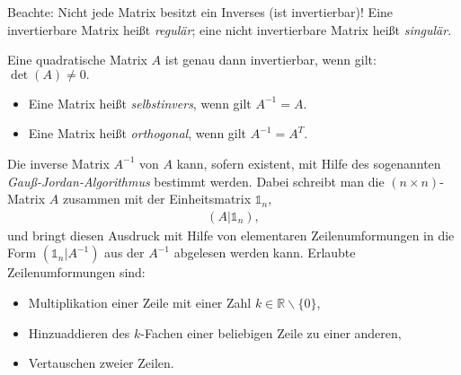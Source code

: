 Beachte: Nicht jede Matrix besitzt ein Inverses (ist invertierbar)! Eine invertierbare Matrix heißt \emph{regulär}; eine nicht invertierbare Matrix heißt \emph{singulär}. 
\begin{satz}
    Eine quadratische Matrix $A$ ist genau dann invertierbar, wenn gilt: $\det(A) \neq 0.$
\end{satz}
\begin{itemize}
    \item Eine Matrix heißt \emph{selbstinvers}, wenn gilt $A^{-1} =A$. 
    \item Eine Matrix heißt \emph{orthogonal}, wenn gilt $A^{-1} = A^T$.
\end{itemize}
Die inverse Matrix $A^{-1}$ von $A$ kann, sofern existent, mit Hilfe des sogenannten \emph{Gauß-Jordan-Algorithmus} bestimmt werden. Dabei schreibt man die $(n\times n)$-Matrix $A$ zusammen mit der Einheitsmatrix $\mathds{1}_n$, 
\begin{align}
    (A | \mathds{1}_n),
\end{align}
und bringt diesen Ausdruck mit Hilfe von elementaren Zeilenumformungen in die Form $(\mathds{1}_n | A^{-1})$ aus der $A^{-1}$ abgelesen werden kann. Erlaubte Zeilenumformungen sind: 
\begin{itemize}
    \item Multiplikation einer Zeile mit einer Zahl $k \in \mathbb{R}\backslash\{0\}$, 
    \item Hinzuaddieren des $k$-Fachen einer beliebigen Zeile zu einer anderen, 
    \item Vertauschen zweier Zeilen.
\end{itemize}

